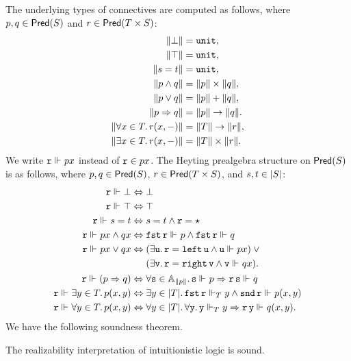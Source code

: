 The underlying types of connectives are computed as follows, where $p, q \in \Pred{S}$ and $r \in \Pred{T \times S}$:
%
\begin{align*}
  \T{\bot} &= \unit, \\
  \T{\top} &= \unit, \\
  \T{s = t} &= \unit, \\
  \T{p \land q} &= \T{p} \times \T{q},\\
  \T{p \lor q} &= \T{p} + \T{q},\\
  \T{p \lthen q} &= \T{p} \to \T{q}.\\
  \T{\all{x \in T}{r(x, {-})}} &= \T{T} \to \T{r}, \\
  \T{\some{x \in T}{r(x, {-})}} &= \T{T} \times \T{r}.
\end{align*}
%
We write $\R{r} \rz p x$ instead of $\R{r} \in p x$.
The Heyting prealgebra structure on $\Pred{S}$ is as follows, where $p, q \in \Pred{S}$,
$r \in \Pred{T \times S}$, and $s, t \in \S{S}$:
%
\begin{align*}
  \R{r} \rz \bot &\liff \bot\\
  \R{r} \rz \top &\liff \top\\
  \R{r} \rz s = t &\liff s = t \land \R{r} = \star\\
  \R{r} \rz p x \land q x &\liff
  \combFst\,\R{r} \rz p \land \combFst\,\R{r} \rz q\\
  \R{r} \rz p x \lor q x
    &\liff
    \begin{aligned}[t]
      & (\some{\R{u}} \R{r} = \combLeft\,\R{u} \land \R{u} \rz p x)
      \lor {} \\
      &(\some{\R{v}} \R{r} = \combRight\,\R{v} \land \R{v} \rz q x).
    \end{aligned}
  \\
  \R{r} \rz (p \lthen q) &\liff
  \all{\R{s} \in \Atyp{\T{p}}} \R{s} \rz p \lthen \R{r}\,\R{s} \rz q
  \\
  \R{r} \rz \some{y \in T} p(x,y) &\liff
  \some{y \in \S{T}} \combFst\,\R{r} \rz[T] y \land \combSnd\,\R{r} \rz p(x,y)
  \\
  \R{r} \rz \all{y \in T} p(x, y) &\liff
    \all{y \in \S{T}} \all{\R{y}}
     \R{y} \rz[T] y \lthen \R{r}\,\R{y} \rz q(x,y).
\end{align*}
%
We have the following soundness theorem.

\begin{theorem}
  The realizability interpretation of intuitionistic logic is sound.
\end{theorem}

